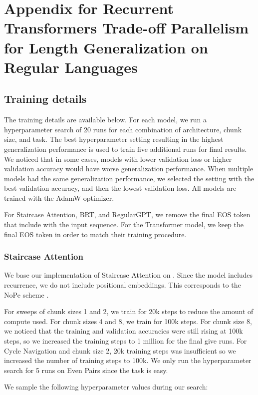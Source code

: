 \chapter{Appendix for Recurrent Transformers Trade-off Parallelism for Length Generalization on Regular Languages} \label{chap:appendix-D}

\section{Training details} \label{sec:recurrent-training-details}
The training details are available below. For each model, we run a hyperparameter search of 20 runs for each combination of architecture, chunk size, and task. The best hyperparameter setting resulting in the highest generalization performance is used to train five additional runs for final results. We noticed that in some cases, models with lower validation loss or higher validation accuracy would have worse generalization performance. When multiple models had the same generalization performance, we selected the setting with the best validation accuracy, and then the lowest validation loss. All models are trained with the AdamW optimizer.

For Staircase Attention, BRT, and RegularGPT, we remove the final EOS token that \citet{deletang_neural_2022} include with the input sequence. For the Transformer model, we keep the final EOS token in order to match their training procedure.

\subsection{Staircase Attention}
We base our implementation of Staircase Attention on \citet{ju_staircase_2022}. Since the model includes recurrence, we do not include positional embeddings. This corresponds to the NoPe scheme \citep{kazemnejad_impact_2023}.

For sweeps of chunk sizes 1 and 2, we train for 20k steps to reduce the amount of compute used. For chunk sizes 4 and 8, we train for 100k steps. For chunk size 8, we noticed that the training and validation accuracies were still rising at 100k steps, so we increased the training steps to 1 million for the final give runs. For Cycle Navigation and chunk size 2, 20k training steps was insufficient so we increased the number of training steps to 100k. We only run the hyperparameter search for 5 runs on Even Pairs since the task is easy.

We sample the following hyperparameter values during our search:

